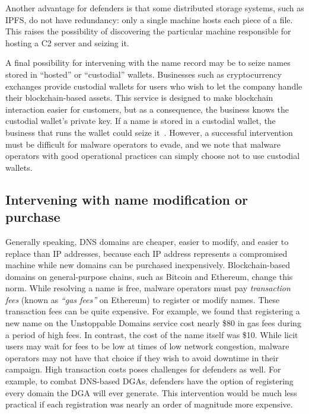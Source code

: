 Another advantage for defenders is that some distributed storage systems, 
such as IPFS, do not have redundancy: only a single machine hosts each piece of 
a file. This raises the possibility of discovering the particular machine 
responsible for hosting a C2 server and seizing it. 

A final possibility for intervening with the name record may be to seize 
names stored in ``hosted'' or ``custodial'' wallets. Businesses such 
as cryptocurrency exchanges provide custodial wallets for users who wish to let 
the company handle their blockchain-based assets. This service is designed to 
make blockchain interaction easier for customers, but as a consequence, the 
business knows the custodial wallet's private key. If a name is stored in a 
custodial wallet, the business that runs the wallet 
could seize it~\cite{pegoraro_blockchain_2021}. However, a 
successful intervention must be difficult for malware operators to 
evade, and we note that malware operators with good operational practices can 
simply choose not to use custodial wallets. 

\subsection{Intervening with name modification or purchase}

Generally speaking, DNS domains are cheaper, easier to modify, and 
easier to replace than IP addresses, because each IP address 
represents a compromised machine while new domains can be 
purchased inexpensively. Blockchain-based domains on 
general-purpose chains, such as Bitcoin and Ethereum, 
change this norm. While resolving a name is free, malware 
operators must pay \emph{transaction fees} 
(known as \emph{``gas fees''} on Ethereum)
to register or modify names. These transaction fees 
can be quite expensive. For example, we found that 
registering a new name on the Unstoppable Domains service 
cost nearly \$80 in gas fees during a period of high fees. 
In contrast, the cost of the name itself was \$10. While 
licit users may wait for fees to be low at times of low 
network congestion, malware operators may not have that 
choice if they wish to avoid downtime in their campaign. High 
transaction costs poses challenges for defenders as well. For 
example, to combat DNS-based DGAs, defenders have the option 
of registering every domain the DGA will ever generate. This 
intervention would be much less practical if each 
registration was nearly an order of magnitude more expensive.

